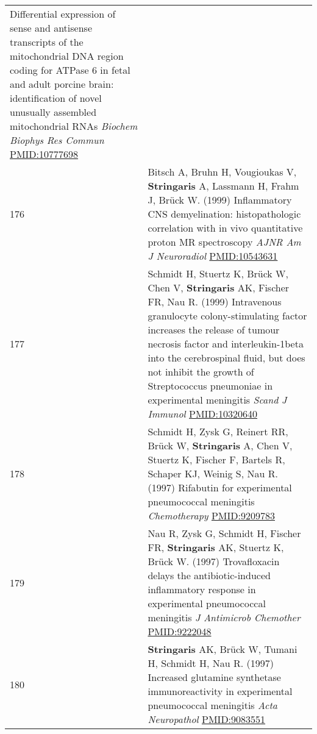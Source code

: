 \documentclass[
]{article}
\begin{document}
\begin{longtable}[]{@{}ll@{}}
\begin{minipage}[t]{0.94\columnwidth}
Differential expression of sense and antisense transcripts of the
mitochondrial DNA region coding for ATPase 6 in fetal and adult porcine
brain: identification of novel unusually assembled mitochondrial RNAs
\emph{Biochem Biophys Res Commun} \url{PMID:10777698}\strut
\end{minipage}\tabularnewline
\begin{minipage}[t]{0.01\columnwidth}\raggedright
176\strut
\end{minipage} & \begin{minipage}[t]{0.94\columnwidth}\raggedright
Bitsch A, Bruhn H, Vougioukas V, \textbf{Stringaris} A, Lassmann H,
Frahm J, Brück W. (1999) Inflammatory CNS demyelination: histopathologic
correlation with in vivo quantitative proton MR spectroscopy \emph{AJNR
Am J Neuroradiol} \url{PMID:10543631}\strut
\end{minipage}\tabularnewline
\begin{minipage}[t]{0.01\columnwidth}\raggedright
177\strut
\end{minipage} & \begin{minipage}[t]{0.94\columnwidth}\raggedright
Schmidt H, Stuertz K, Brück W, Chen V, \textbf{Stringaris} AK, Fischer
FR, Nau R. (1999) Intravenous granulocyte colony-stimulating factor
increases the release of tumour necrosis factor and interleukin-1beta
into the cerebrospinal fluid, but does not inhibit the growth of
Streptococcus pneumoniae in experimental meningitis \emph{Scand J
Immunol} \url{PMID:10320640}\strut
\end{minipage}\tabularnewline
\begin{minipage}[t]{0.01\columnwidth}\raggedright
178\strut
\end{minipage} & \begin{minipage}[t]{0.94\columnwidth}\raggedright
Schmidt H, Zysk G, Reinert RR, Brück W, \textbf{Stringaris} A, Chen V,
Stuertz K, Fischer F, Bartels R, Schaper KJ, Weinig S, Nau R. (1997)
Rifabutin for experimental pneumococcal meningitis \emph{Chemotherapy}
\url{PMID:9209783}\strut
\end{minipage}\tabularnewline
\begin{minipage}[t]{0.01\columnwidth}\raggedright
179\strut
\end{minipage} & \begin{minipage}[t]{0.94\columnwidth}\raggedright
Nau R, Zysk G, Schmidt H, Fischer FR, \textbf{Stringaris} AK, Stuertz K,
Brück W. (1997) Trovafloxacin delays the antibiotic-induced inflammatory
response in experimental pneumococcal meningitis \emph{J Antimicrob
Chemother} \url{PMID:9222048}\strut
\end{minipage}\tabularnewline
\begin{minipage}[t]{0.01\columnwidth}\raggedright
180\strut
\end{minipage} & \begin{minipage}[t]{0.94\columnwidth}\raggedright
\textbf{Stringaris} AK, Brück W, Tumani H, Schmidt H, Nau R. (1997)
Increased glutamine synthetase immunoreactivity in experimental
pneumococcal meningitis \emph{Acta Neuropathol} \url{PMID:9083551}\strut
\end{minipage}\tabularnewline
\bottomrule
\end{longtable}
\end{document}
